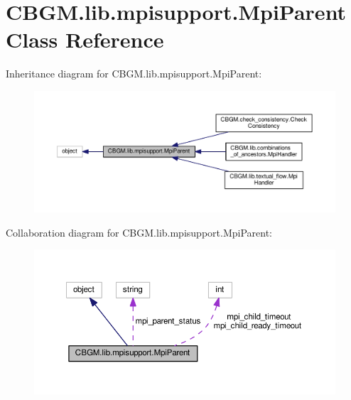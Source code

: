 \hypertarget{classCBGM_1_1lib_1_1mpisupport_1_1MpiParent}{}\section{C\+B\+G\+M.\+lib.\+mpisupport.\+Mpi\+Parent Class Reference}
\label{classCBGM_1_1lib_1_1mpisupport_1_1MpiParent}


Inheritance diagram for C\+B\+G\+M.\+lib.\+mpisupport.\+Mpi\+Parent\+:\nopagebreak
\begin{figure}[H]
\begin{center}
\leavevmode
\includegraphics[width=350pt]{classCBGM_1_1lib_1_1mpisupport_1_1MpiParent__inherit__graph}
\end{center}
\end{figure}


Collaboration diagram for C\+B\+G\+M.\+lib.\+mpisupport.\+Mpi\+Parent\+:\nopagebreak
\begin{figure}[H]
\begin{center}
\leavevmode
\includegraphics[width=350pt]{classCBGM_1_1lib_1_1mpisupport_1_1MpiParent__coll__graph}
\end{center}
\end{figure}
